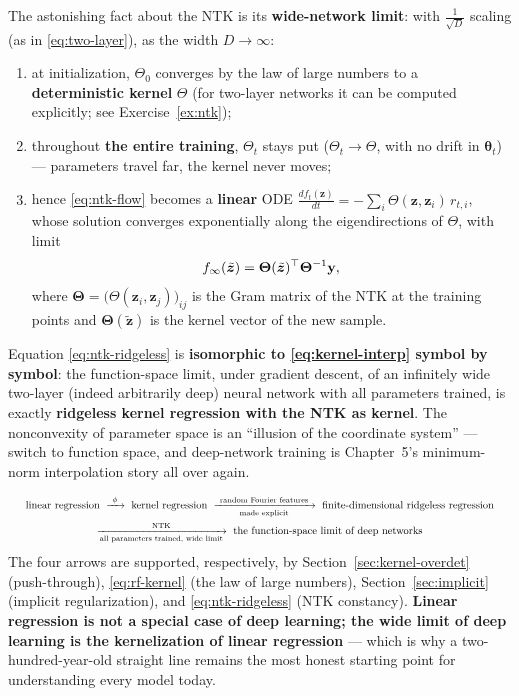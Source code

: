 The astonishing fact about the NTK is its \textbf{wide-network limit}: with $\tfrac{1}{\sqrt{D}}$ scaling (as in \eqref{eq:two-layer}), as the width $D \to \infty$:

\begin{enumerate}[label=(\arabic*)]
  \item at initialization, $\Theta_0$ converges by the law of large numbers to a \textbf{deterministic kernel} $\Theta$ (for two-layer networks it can be computed explicitly; see Exercise~\ref{ex:ntk});
  \item throughout \textbf{the entire training}, $\Theta_t$ stays put ($\Theta_t \to \Theta$, with no drift in $\bm{\theta}_t$) --- parameters travel far, the kernel never moves;
  \item hence \eqref{eq:ntk-flow} becomes a \textbf{linear} ODE $\frac{df_t(\bm{z})}{dt} = -\sum_i \Theta(\bm{z},\bm{z}_i)\, r_{t,i}$, whose solution converges exponentially along the eigendirections of $\Theta$, with limit
  \begin{equation}\label{eq:ntk-ridgeless}
    f_\infty(\tilde{\bm{z}}) = \bm{\Theta}(\tilde{\bm{z}})^\top \bm{\Theta}^{-1} \mathbf{y},
  \end{equation}
  where $\bm{\Theta} = \big(\Theta(\bm{z}_i,\bm{z}_j)\big)_{ij}$ is the Gram matrix of the NTK at the training points and $\bm{\Theta}(\tilde{\bm{z}})$ is the kernel vector of the new sample.
\end{enumerate}

Equation \eqref{eq:ntk-ridgeless} is \textbf{isomorphic to \eqref{eq:kernel-interp} symbol by symbol}: the function-space limit, under gradient descent, of an infinitely wide two-layer (indeed arbitrarily deep\cite{lee2019}) neural network with all parameters trained, is exactly \textbf{ridgeless kernel regression with the NTK as kernel}. The nonconvexity of parameter space is an ``illusion of the coordinate system'' --- switch to function space, and deep-network training is Chapter~5's minimum-norm interpolation story all over again.

\begin{keybox}
\[
\resizebox{0.97\textwidth}{!}{$\begin{gathered}
\text{linear regression } \xrightarrow{\ \phi\ } \text{ kernel regression } \xrightarrow[\text{made explicit}]{\ \text{random Fourier features}\ } \text{ finite-dimensional ridgeless regression} \\
\xrightarrow[\text{all parameters trained, wide limit}]{\ \mathrm{NTK}\ } \text{ the function-space limit of deep networks}
\end{gathered}$}
\]
The four arrows are supported, respectively, by Section~\ref{sec:kernel-overdet} (push-through), \eqref{eq:rf-kernel} (the law of large numbers), Section~\ref{sec:implicit} (implicit regularization), and \eqref{eq:ntk-ridgeless} (NTK constancy). \textbf{Linear regression is not a special case of deep learning; the wide limit of deep learning is the kernelization of linear regression} --- which is why a two-hundred-year-old straight line remains the most honest starting point for understanding every model today.
\end{keybox}

